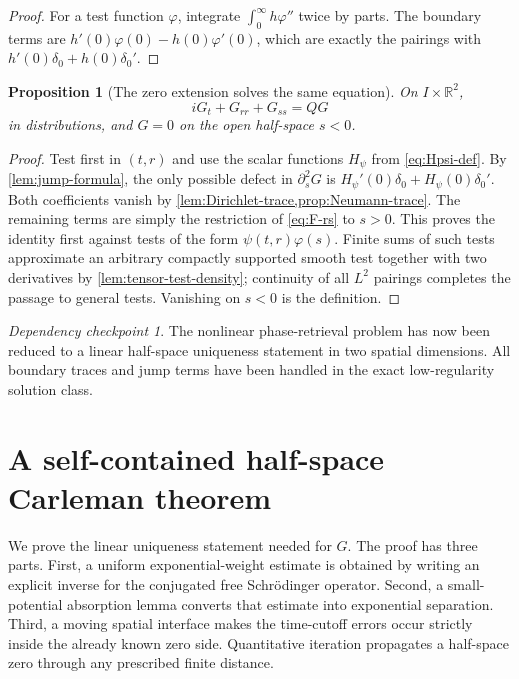 \documentclass[11pt,oneside]{book}
\newtheorem{proposition}[theorem]{Proposition}
\theoremstyle{definition}
\theoremstyle{remark}
\newtheorem{checkpoint}[theorem]{Dependency checkpoint}
\newcommand{\R}{\mathbb R}
\newcommand{\1}{\mathbf 1}
\begin{document}
\begin{proof}
For a test function $\varphi$, integrate $\int_0^\infty h\varphi''$ twice by
parts.  The boundary terms are $h'(0)\varphi(0)-h(0)\varphi'(0)$, which are
exactly the pairings with $h'(0)\delta_0+h(0)\delta_0'$.
\end{proof}

\begin{proposition}[The zero extension solves the same equation]
\label{prop:G-equation}
On $I\times\R^2$,
\begin{equation}
 iG_t+G_{rr}+G_{ss}=QG                            \label{eq:G-equation}
\end{equation}
in distributions, and $G=0$ on the open half-space $s<0$.
\end{proposition}

\begin{proof}
Test first in $(t,r)$ and use the scalar functions $H_\psi$ from
\eqref{eq:Hpsi-def}.  By \cref{lem:jump-formula}, the only possible defect in
$\partial_s^2G$ is
$H_\psi'(0)\delta_0+H_\psi(0)\delta_0'$.  Both coefficients vanish by
\cref{lem:Dirichlet-trace,prop:Neumann-trace}.  The remaining terms are
simply the restriction of \eqref{eq:F-rs} to $s>0$.  This proves the identity
first against tests of the form $\psi(t,r)\varphi(s)$.  Finite sums of such tests approximate an
arbitrary compactly supported smooth test together with two derivatives by
\cref{lem:tensor-test-density}; continuity of all $L^2$ pairings completes
the passage to general tests.  Vanishing on $s<0$ is the definition.
\end{proof}

\begin{checkpoint}
The nonlinear phase-retrieval problem has now been reduced to a linear
half-space uniqueness statement in two spatial dimensions.  All boundary
traces and jump terms have been handled in the exact low-regularity solution
class.
\end{checkpoint}

\chapter{A self-contained half-space Carleman theorem}\label{chap:carleman}

We prove the linear uniqueness statement needed for $G$.  The proof has three
parts.  First, a uniform exponential-weight estimate is obtained by writing an
explicit inverse for the conjugated free Schr\"odinger operator.  Second, a
small-potential absorption lemma converts that estimate into exponential
separation.  Third, a moving spatial interface makes the time-cutoff errors
occur strictly inside the already known zero side.  Quantitative iteration
propagates a half-space zero through any prescribed finite distance.
\end{document}
